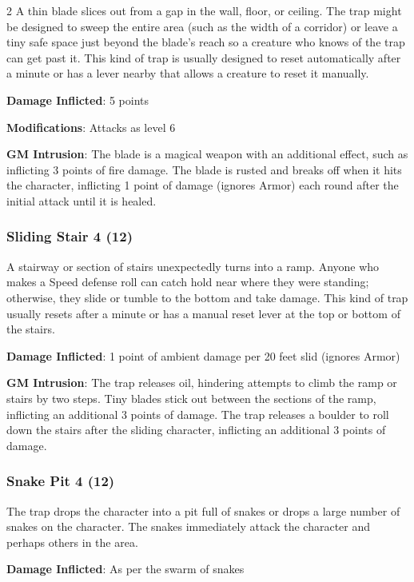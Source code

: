 \begin{multicols}{2}
A thin blade slices out from a gap in the wall, floor, or ceiling. The trap might be designed to sweep the entire area (such as the width of a corridor) or leave a tiny safe space just beyond the blade’s reach so a creature who knows of the trap can get past it. This kind of trap is usually designed to reset automatically after a minute or has a lever nearby that allows a creature to reset it manually. 

\textbf{Damage Inflicted}: 5 points 

\textbf{Modifications}: Attacks as level 6 

\textbf{GM Intrusion}: The blade is a magical weapon with an additional effect, such as inflicting 3 points of fire damage. The blade is rusted and breaks off when it hits the character, inflicting 1 point of damage (ignores Armor) each round after the initial attack until it is healed.

\subsubsection{Sliding Stair 4 (12)}

A stairway or section of stairs unexpectedly turns into a ramp. Anyone who makes a Speed defense roll can catch hold near where they were standing; otherwise, they slide or tumble to the bottom and take damage. This kind of trap usually resets after a minute or has a manual reset lever at the top or bottom of the stairs. 

\textbf{Damage Inflicted}: 1 point of ambient damage per 20 feet slid (ignores Armor) 

\textbf{GM Intrusion}: The trap releases oil, hindering attempts to climb the ramp or stairs by two steps. Tiny blades stick out between the sections of the ramp, inflicting an additional 3 points of damage. The trap releases a boulder to roll down the stairs after the sliding character, inflicting an additional 3 points of damage.

\subsubsection{Snake Pit 4 (12)}

The trap drops the character into a pit full of snakes or drops a large number of snakes on the character. The snakes immediately attack the character and perhaps others in the area. 

\textbf{Damage Inflicted}: As per the swarm of snakes 


\end{multicols}
